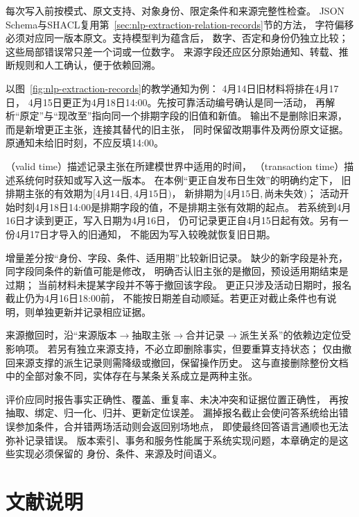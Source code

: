 每次写入前按模式、原文支持、对象身份、限定条件和来源完整性检查。
JSON Schema与SHACL复用第~\ref{sec:nlp-extraction-relation-records}节的方法，
字符偏移必须对应同一版本原文。支持模型判为蕴含后，
数字、否定和身份仍独立比较；这些局部错误常只差一个词或一位数字。
来源字段还应区分原始通知、转载、推断规则和人工确认，便于依赖回溯。

以图~\ref{fig:nlp-extraction-records}的教学通知为例：
4月14日旧材料将排在4月17日，
4月15日更正为4月18日14:00。先按可靠活动编号确认是同一活动，
再解析“原定”与“现改至”指向同一个排期字段的旧值和新值。
输出不是删除旧来源，而是新增更正主张，连接其替代的旧主张，
同时保留改期事件及两份原文证据。原通知未给旧时刻，不应反填14:00。

（valid time）描述记录主张在所建模世界中适用的时间，
（transaction time）描述系统何时获知或写入这一版本。
在本例“更正自发布日生效”的明确约定下，
旧排期主张的有效期为$[\text{4月14日},\text{4月15日})$，
新排期为$[\text{4月15日},\text{尚未失效})$；
活动开始时刻4月18日14:00是排期字段的值，不是排期主张有效期的起点。
若系统到4月16日才读到更正，写入日期为4月16日，
仍可记录更正自4月15日起有效。另有一份4月17日才导入的旧通知，
不能因为写入较晚就恢复旧日期。

增量差分按“身份、字段、条件、适用期”比较新旧记录。
缺少的新字段是补充，同字段同条件的新值可能是修改，
明确否认旧主张的是撤回，预设适用期结束是过期；
当前材料未提某字段并不等于撤回该字段。
更正只涉及活动日期时，报名截止仍为4月16日18:00前，
不能按日期差自动顺延。若更正对截止条件也有说明，则单独更新并记录相应证据。

来源撤回时，沿“来源版本$\to$抽取主张$\to$合并记录$\to$派生关系”的依赖边定位受影响项。
若另有独立来源支持，不必立即删除事实，但要重算支持状态；
仅由撤回来源支撑的派生记录则需降级或撤回，保留操作历史。
这与直接删除整份文档中的全部对象不同，实体存在与某条关系成立是两种主张。

评价应同时报告事实正确性、覆盖、重复率、未决冲突和证据位置正确性，
再按抽取、绑定、归一化、归并、更新定位误差。
漏掉报名截止会使问答系统给出错误参加条件，合并错两场活动则会返回别场地点，
即使最终回答语言通顺也无法弥补记录错误。
版本索引、事务和服务性能属于系统实现问题，本章确定的是这些实现必须保留的
身份、条件、来源及时间语义。

\section*{文献说明}

